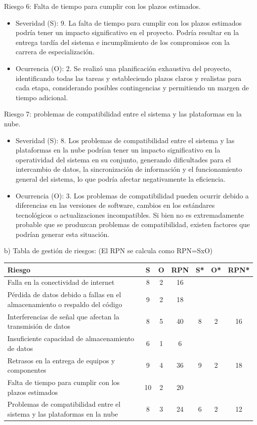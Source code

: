 \documentclass[
11pt, %
]{charter}
\begin{document}
Riesgo 6: Falta de tiempo para cumplir con los plazos estimados.
\begin{itemize}
	\item Severidad (S): 9. La falta de tiempo para cumplir con los plazos estimados podría tener un impacto significativo en el proyecto. Podría resultar en la entrega tardía del sistema e incumplimiento de los compromisos con la carrera de especialización.
	\item Ocurrencia (O): 2. Se realizó una planificación exhaustiva del proyecto, identificando todas las tareas y estableciendo plazos claros y realistas para cada etapa, considerando posibles contingencias y permitiendo un margen de tiempo adicional.
\end{itemize}

Riesgo 7: problemas de compatibilidad entre el sistema y las plataformas en la nube.
\begin{itemize}
	\item Severidad (S): 8. Los problemas de compatibilidad entre el sistema y las plataformas en la nube podrían tener un impacto significativo en la operatividad del sistema en su conjunto, generando dificultades para el intercambio de datos, la sincronización de información y el funcionamiento general del sistema, lo que podría afectar negativamente la eficiencia.
	\item Ocurrencia (O): 3. Los problemas de compatibilidad pueden ocurrir debido a diferencias en las versiones de software, cambios en los estándares tecnológicos o actualizaciones incompatibles. Si bien no es extremadamente probable que se produzcan problemas de compatibilidad, existen factores que podrían generar esta situación.
\end{itemize}


b) Tabla de gestión de riesgos:      (El RPN se calcula como RPN=SxO)

\begin{table}[htpb]
\centering
\begin{tabularx}{\linewidth}{@{}|X|c|c|c|c|c|c|@{}}
\hline
\rowcolor[HTML]{C0C0C0} 
Riesgo & S & O & RPN & S* & O* & RPN* \\ \hline
Falla en la conectividad de internet       & 8  & 2  &  16   &    &    &      \\ \hline
Pérdida de datos debido a fallas en el almacenamiento o respaldo del código & 9  & 2  &  18   &    &    &      \\ \hline
Interferencias de señal que afectan la transmisión de datos  &  8 & 5  &  40   &  8  &  2  & 16     \\ \hline
Insuficiente capacidad de almacenamiento de datos & 6  & 1  &  6   &    &    &      \\ \hline
Retrasos en la entrega de equipos y componentes       & 9  & 4  &  36   &  9  &  2  & 18     \\ \hline
Falta de tiempo para cumplir con los plazos estimados & 10  & 2 & 20  &    &    &      \\ \hline
Problemas de compatibilidad entre el sistema y las plataformas en la nube & 8  & 3  &  24  &  6  & 2   &  12    \\ \hline
\end{tabularx}%
\end{table}
\end{document}
